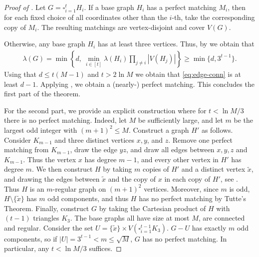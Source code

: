 \documentclass[10pt,a4paper]{article}
\begin{document}
\begin{proof}[Proof of ]
Let $G=\square_{i=1}^t H_i$. If a base graph $H_i$ has a perfect matching $M_i$, then for each fixed choice of all coordinates other than the $i$-th, take the corresponding copy of $M_i$. The resulting matchings are vertex-disjoint and cover $V(G)$.

Otherwise, any base graph $H_i$ has at least three vertices. Thus, by  we obtain that
\begin{align} \label{eq:edge-conn}
      \lambda(G)
  =\min\left\{d,\ \min_{i\in[t]}\lambda(H_i)\prod_{j\ne i}|V(H_j)|\right\} \geq \min\{d, 3^{t-1}\}.
\end{align}
Using that $d \leq t(M-1)$ and $t > 2\ln M$ we obtain that \eqref{eq:edge-conn} is at least $d-1$.
Applying , we obtain a (nearly-) perfect matching. This concludes the first part of the theorem.

For the second part, we provide an explicit construction where for $t<\ln M/3$ there is no perfect matching. Indeed, let $M$ be sufficiently large, and let $m$ be the largest odd integer with $(m+1)^2\le M$. 
Construct a graph $H'$ as follows. Consider $K_{m-1}$ and three distinct vertices $x,y$, and $z$. Remove one perfect matching from $K_{m-1}$, draw the edge $yz$, and draw all edges between $x,y,z$ and $K_{m-1}$. Thus the vertex $x$ has degree $m-1$, and every other vertex in $H'$ has degree $m$. We then construct $H$ by taking $m$ copies of $H'$ and a distinct vertex $\tilde x$, and drawing the edges between $\tilde x$ and the copy of $x$ in each copy of $H'$, see . Thus $H$ is an $m$-regular graph on $(m+1)^2$ vertices. Moreover, since $m$ is odd, $H\setminus \{\tilde x\}$ has $m$ odd components, and thus $H$ has no perfect matching by Tutte's Theorem. Finally, construct $G$ by taking the Cartesian product of $H$ with $(t-1)$ triangles $K_3$. The base graphs all have size at most $M$, are connected and regular. Consider the set $U=\{\tilde x\}\times V(\square_{i=1}^{t-1}K_3)$. $G-U$ has exactly $m$ odd components, so if $|U|=3^{t-1}<m\le \sqrt{M}$, $G$ has no perfect matching. In particular, any $t<\ln M/3$ suffices.
\end{proof}
\end{document}
